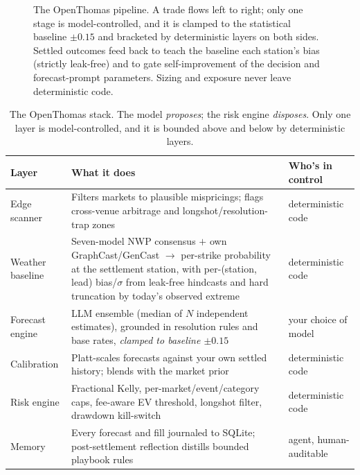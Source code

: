 \documentclass[10pt,twocolumn]{article}
\begin{document}
\begin{figure}[t]
\caption{The OpenThomas pipeline. A trade flows left to right; only one stage
is model-controlled, and it is clamped to the statistical baseline $\pm 0.15$
and bracketed by deterministic layers on both sides. Settled outcomes feed back
to teach the baseline each station's bias (strictly leak-free) and to gate
self-improvement of the decision and forecast-prompt parameters. Sizing and
exposure never leave deterministic code.}
\label{fig:pipeline}
\end{figure}

\begin{table}[t]
\centering
\small
\begin{tabular}{@{}p{2.4cm}p{9.5cm}p{3.0cm}@{}}
\toprule
\textbf{Layer} & \textbf{What it does} & \textbf{Who's in control} \\
\midrule
Edge scanner & Filters markets to plausible mispricings; flags cross-venue arbitrage and longshot/resolution-trap zones & deterministic code \\
Weather baseline & Seven-model NWP consensus $+$ own GraphCast/GenCast $\to$ per-strike probability at the settlement station, with per-(station, lead) bias/$\sigma$ from leak-free hindcasts and hard truncation by today's observed extreme & deterministic code \\
Forecast engine & LLM ensemble (median of $N$ independent estimates), grounded in resolution rules and base rates, \emph{clamped to baseline $\pm 0.15$} & your choice of model \\
Calibration & Platt-scales forecasts against your own settled history; blends with the market prior & deterministic code \\
Risk engine & Fractional Kelly, per-market/event/category caps, fee-aware EV threshold, longshot filter, drawdown kill-switch & deterministic code \\
Memory & Every forecast and fill journaled to SQLite; post-settlement reflection distills bounded playbook rules & agent, human-auditable \\
\bottomrule
\end{tabular}
\caption{The OpenThomas stack. The model \emph{proposes}; the risk engine
\emph{disposes}. Only one layer is model-controlled, and it is bounded above and
below by deterministic layers.}
\label{tab:layers}
\end{table}
\end{document}
